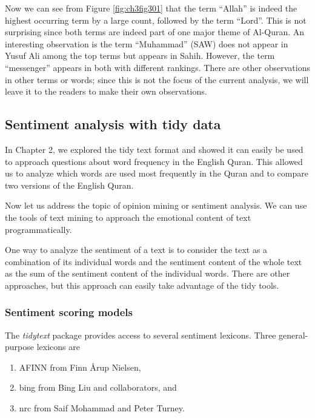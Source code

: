 \documentclass[
]{article}
\providecommand{\tightlist}{%
  \setlength{\itemsep}{0pt}\setlength{\parskip}{0pt}}
\begin{document}
Now we can see from Figure \ref{fig:ch3fig301} that the term ``Allah'' is indeed the highest occurring term by a large count, followed by the term ``Lord''. This is not surprising since both terms are indeed part of one major theme of Al-Quran. An interesting observation is the term ``Muhammad'' (SAW) does not appear in Yusuf Ali among the top terms but appears in Sahih. However, the term ``messenger'' appears in both with different rankings. There are other observations in other terms or words; since this is not the focus of the current analysis, we will leave it to the readers to make their own observations.

\hypertarget{sentiment-analysis-with-tidy-data}{%
\subsection{Sentiment analysis with tidy data}\label{sentiment-analysis-with-tidy-data}}

In Chapter 2, we explored the tidy text format and showed it can easily be used to approach questions about word frequency in the English Quran. This allowed us to analyze which words are used most frequently in the Quran and to compare two versions of the English Quran.

Now let us address the topic of opinion mining or sentiment analysis. We can use the tools of text mining to approach the emotional content of text programmatically.

One way to analyze the sentiment of a text is to consider the text as a combination of its individual words and the sentiment content of the whole text as the sum of the sentiment content of the individual words. There are other approaches, but this approach can easily take advantage of the tidy tools.

\hypertarget{sentiment-scoring-models}{%
\subsubsection{Sentiment scoring models}\label{sentiment-scoring-models}}

The \emph{tidytext} package provides access to several sentiment lexicons. Three general-purpose lexicons are

\begin{enumerate}
\def\labelenumi{\arabic{enumi}.}
\tightlist
\item
  AFINN from Finn Årup Nielsen,
\item
  bing from Bing Liu and collaborators, and
\item
  nrc from Saif Mohammad and Peter Turney.
\end{enumerate}
\end{document}

